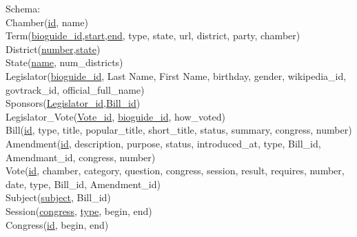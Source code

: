 \documentclass{article}
\begin{document}
\iffalse
Base relations:\\ Party ( \underline{name} )\\ Congressperson ( \underline{name} ) \\ Chamber of Congress ( \underline{name}, seats )\\ Bill ( \underline{name}, \underline{bill\_ID}, text )\\ State ( \underline{name}, number of representatives ) \\ Senator ( \underline{name} ) \\ Representative ( \underline{name} , district ) \\
\\
Relations from relationships: \\
Congress Person ( \underline{Name}, Party, Chamber, State, Is\_a ) $<$--chamber define is\_a relationship? \\ 
Bill ( \underline{Name}, \underline{Bill\_ID}, Text, Sponsors, Chamber ) $<$--outcome of vote? \\ 
Represents district (\underline{district name}, representative, state) \\
Vote ( \underline{bill}, \underline{bill\_id}, chamber, how voted ) $<$-- want to be able to link congress person to a vote
\fi

\noindent
Schema:\\
Chamber(\underline{id}, name)\\
Term(\underline{bioguide\_id},\underline{start},\underline{end}, type, state, url, district, party, chamber)\\
District(\underline{number},\underline{state})\\
State(\underline{name}, num\_districts)\\
Legislator(\underline{bioguide\_id}, Last Name, First Name, birthday, gender, wikipedia\_id, govtrack\_id, official\_full\_name)\\
Sponsors(\underline{Legislator\_id},\underline{Bill\_id})\\
Legislator\_Vote(\underline{Vote\_id}, \underline{bioguide\_id}, how\_voted)\\
Bill(\underline{id}, type, title, popular\_title, short\_title, status, summary, congress, number)\\
Amendment(\underline{id}, description, purpose, status, introduced\_at, type, Bill\_id, Amendmant\_id, congress, number)\\
Vote(\underline{id}, chamber, category, question, congress, session, result, requires, number, date, type, Bill\_id, Amendment\_id)\\
Subject(\underline{subject}, Bill\_id)\\
Session(\underline{congress}, \underline{type}, begin, end)\\
Congress(\underline{id}, begin, end)\\
\end{document}
